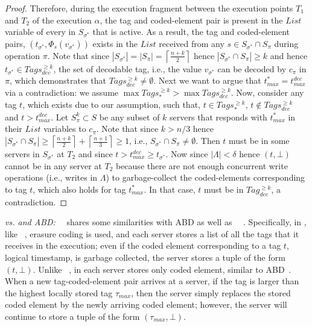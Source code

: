 \begin{proof}
				 Therefore, during the execution fragment between the execution points $T_1$ and $T_2$ of the execution $\alpha$, the tag and coded-element pair is present in the $List$ variable of every in $S_{\sigma^*}$ that is active. As a result, the tag and coded-element pairs, $(t_{\sigma^*}, \Phi_s(v_{\sigma^*}))$ exists in the $List$ received from any
				  $s \in S_{\sigma^*} \cap S_{\pi}$ during operation $\pi$. Note that since $|S_{\sigma^*}| = |S_{\pi}| =\left\lceil \frac{n+k}{2} \right \rceil $ hence
				 $| S_{\sigma^*} \cap S_{\pi} | \geq k$ and hence 
				 $t_{\sigma^*} \in Tags_{dec}^{\geq k} $, the set of decodable tag, i.e., the value $v_{\sigma^*}$ can be decoded
				  by $c_{\pi}$ in $\pi$, which demonstrates that $Tags_{dec}^{\geq k}  \neq \emptyset$. Next we want to 
				  argue that 
				  $t_{max}^* = t_{max}^{dec}$ via a contradiction: we assume 
				  $ \max Tags_{*}^{\geq k}  >  \max Tags_{dec}^{\geq k}  $. Now, consider any tag $t$, which  exists due to our assumption,  such that, 
				  $t \in Tags_{*}^{\geq k} $,  $t \not\in Tags_{dec}^{\geq k} $ and $t > t_{max}^{dec}$.
				 Let $S^k_{\pi} \subset S$ be any subset of $k$ servers that responds with $t^*_{max}$ in their $List$ variables to $c_{\pi}$. Note that since $k >  n/3$ hence $|S_{\sigma^*} \cap S_{\pi}|  \geq \left\lceil \frac{n+k}{2} \right \rceil +  \left\lceil \frac{n+1}{3} \right \rceil \geq 1$, i.e., $S_{\sigma^*} \cap S_{\pi} \neq \emptyset$. Then $t$ 
				 must be in some servers in $S_{\sigma^*}$ at $T_2$ and since $t > t_{max}^{dec} \geq t_{\sigma^*}$. 
				 Now since $|\Lambda| < \delta$ hence $(t, \bot)$ cannot be in any server at $T_2$  because there are not enough concurrent write operations (i.e., writes in $\Lambda$) to garbage-collect the coded-elements corresponding to tag $t$, which also holds  for tag  $t^{*}_{max}$. In that case, $t$ must be in $Tag_{dec}^{\geq k}$, a contradiction.
%
				\end{proof}
				
\noindent\textit{\treasmod{} vs. \treas{} and ABD:}~~\treasmod{}  shares some similarities with ABD \cite{ABD96} as well as ~\treas~\cite{NicolaouC0KML19}. Specifically, in \treasmod{}, like ~\treas{}, erasure coding is used, and each server stores a list of all the tags that it receives in the execution; even if the coded element corresponding to a tag $t$, logical timestamp, is garbage collected, the server stores a tuple of the form $(t, \bot)$. Unlike ~\treas{}, in \treasmod{} each server stores only coded element, similar to ABD~\cite{ABD96}. When a new tag-coded-element pair arrives  at a server, if the tag is larger than the highest locally stored tag $\tau_{max}$, then the server simply replaces the stored coded element by the newly arriving coded element; however, the server will continue to store a tuple of the form $(\tau_{max},\bot)$.

